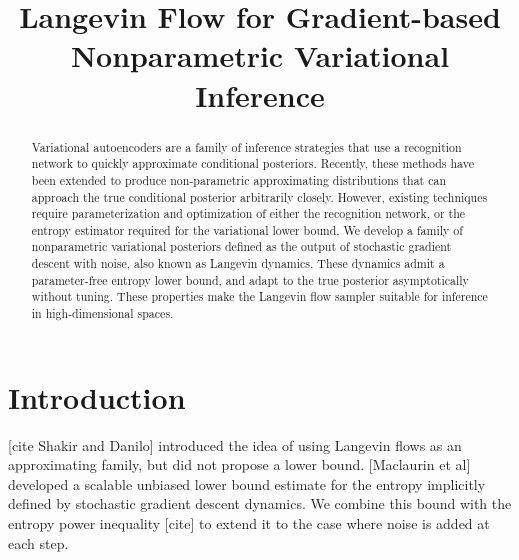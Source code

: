 \documentclass{article}
\title{Langevin Flow for Gradient-based Nonparametric Variational Inference}
\author{}
\begin{document}
\maketitle

\begin{abstract}
Variational autoencoders are a family of inference strategies that use a recognition network to quickly approximate conditional posteriors.
Recently, these methods have been extended to produce non-parametric approximating distributions that can approach the true conditional posterior arbitrarily closely.
However, existing techniques require parameterization and optimization of either the recognition network, or the entropy estimator required for the variational lower bound.
We develop a family of nonparametric variational posteriors defined as the output of stochastic gradient descent with noise, also known as Langevin dynamics.
These dynamics admit a parameter-free entropy lower bound, and adapt to the true posterior asymptotically without tuning.
These properties make the Langevin flow sampler suitable for inference in high-dimensional spaces.
\end{abstract}

\section{Introduction}

[cite Shakir and Danilo] introduced the idea of using Langevin flows as an approximating family, but did not propose a lower bound.
[Maclaurin et al] developed a scalable unbiased lower bound estimate for the entropy implicitly defined by stochastic gradient descent dynamics.
We combine this bound with the entropy power inequality [cite] to extend it to the case where noise is added at each step.
\end{document}
